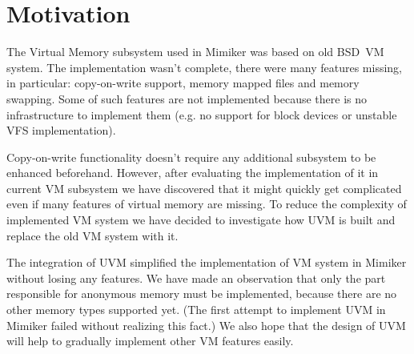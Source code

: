 \section{Motivation}

The Virtual Memory subsystem used in Mimiker was based on old BSD~VM system.
The implementation wasn't complete, there were many features missing, in particular: copy-on-write support, memory mapped files and memory swapping.
Some of such features are not implemented because there is no infrastructure to implement them
(e.g. no support for block devices or unstable VFS implementation).

Copy-on-write functionality doesn't require any additional subsystem to be enhanced beforehand.
However, after evaluating the implementation of it in current VM subsystem we have discovered that it might quickly get complicated
even if many features of virtual memory are missing.
To reduce the complexity of implemented VM system we have decided to investigate how UVM is built and replace the old VM system with it.

The integration of UVM simplified the implementation of VM system in Mimiker without losing any features.
We have made an observation that only the part responsible for anonymous memory must be implemented, because there are no other memory types supported yet.
(The first attempt to implement UVM in Mimiker failed without realizing this fact.)
We also hope that the design of UVM will help to gradually implement other VM features easily.



